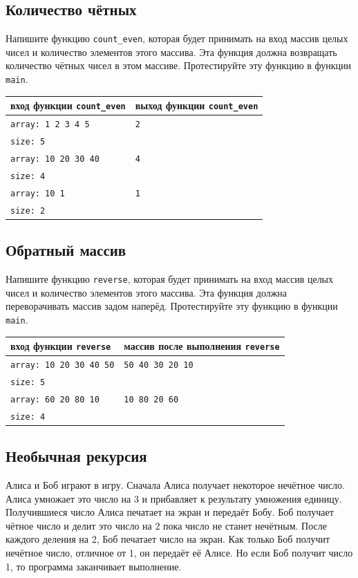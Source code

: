 \documentclass[10pt]{article}
\begin{document}
 
\subsection{Количество чётных}
Напишите функцию \texttt{count\_even}, которая будет принимать на вход массив целых чисел и количество элементов этого массива. Эта функция должна возвращать количество чётных чисел в этом массиве. Протестируйте эту функцию в функции \texttt{main}.
\begin{center}
\begin{tabular}{ l | l }
 вход функции \texttt{count\_even} & выход функции \texttt{count\_even} \\ \hline
 \texttt{array: 1 2 3 4 5} & \texttt{2} \\
 \texttt{size: 5} & \\ \hline
 \texttt{array: 10 20 30 40} & \texttt{4} \\
 \texttt{size: 4} & \\ \hline
 \texttt{array: 10 1} & \texttt{1} \\
 \texttt{size: 2} & \\
\end{tabular}
\end{center} 
 




\subsection{Обратный массив}
Напишите функцию \texttt{reverse}, которая будет принимать на вход массив целых чисел и количество элементов этого массива. Эта функция должна переворачивать массив задом наперёд. Протестируйте эту функцию в функции \texttt{main}.
\begin{center}
\begin{tabular}{ l | l }
 вход функции \texttt{reverse} & массив после выполнения \texttt{reverse} \\ \hline
 \texttt{array: 10 20 30 40 50} & \texttt{50 40 30 20 10} \\
 \texttt{size: 5} & \\ \hline
 \texttt{array: 60 20 80 10} & \texttt{10 80 20 60} \\
 \texttt{size: 4} & \\
\end{tabular}
\end{center} 




\subsection{Необычная рекурсия}
Алиса и Боб играют в игру. Сначала Алиса получает некоторое нечётное число. Алиса умножает это число на 3 и прибавляет к результату умножения единицу. Получившиеся число Алиса печатает на экран и передаёт Бобу. Боб получает чётное число и делит это число на 2 пока число не станет нечётным. После каждого деления на 2, Боб печатает число на экран. Как только Боб получит нечётное число, отличное от 1, он передаёт её Алисе. Но если Боб получит число 1, то программа заканчивает выполнение.
\end{document}

